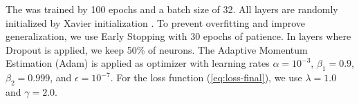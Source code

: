 The \methodname was trained by 100 epochs and a batch size of 32. All layers are randomly initialized by Xavier initialization \citep{glorot2010understanding}. To prevent overfitting and improve generalization, we use Early Stopping with 30 epochs of patience. In layers where Dropout is applied, we keep 50\% of neurons. The Adaptive Momentum Estimation (Adam) is applied as optimizer with learning rates $\alpha=10^{-3}$, $\beta_1=0.9$, $\beta_2=0.999$, and $\epsilon=10^{-7}$. For the loss function (\autoref{eq:loss-final}), we use $\lambda=1.0$ and $\gamma=2.0$.

